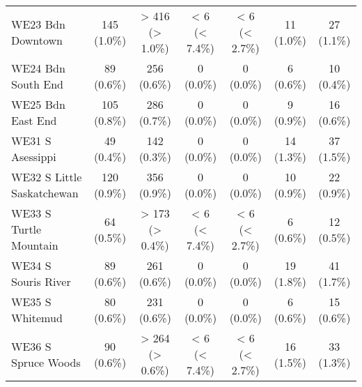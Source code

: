 \documentclass{article}
\begin{document}
\begin{table}[htbp]
\begin{tabular}{l*{6}{c}}
  WE23 Bdn Downtown                                     &           145 (1.0\%)           &         > 416 (> 1.0\%)         &          < 6 (< 7.4\%)          &          < 6 (< 2.7\%)          &            11 (1.0\%)           &            27 (1.1\%)           \\
  WE24 Bdn South End                                    &            89 (0.6\%)           &           256 (0.6\%)           &            0 (0.0\%)            &            0 (0.0\%)            &            6 (0.6\%)            &            10 (0.4\%)           \\
  WE25 Bdn East End                                     &           105 (0.8\%)           &           286 (0.7\%)           &            0 (0.0\%)            &            0 (0.0\%)            &            9 (0.9\%)            &            16 (0.6\%)           \\
  WE31 S Asessippi                                      &            49 (0.4\%)           &           142 (0.3\%)           &            0 (0.0\%)            &            0 (0.0\%)            &            14 (1.3\%)           &            37 (1.5\%)           \\
  WE32 S Little Saskatchewan                            &           120 (0.9\%)           &           356 (0.9\%)           &            0 (0.0\%)            &            0 (0.0\%)            &            10 (0.9\%)           &            22 (0.9\%)           \\
  WE33 S Turtle Mountain                                &            64 (0.5\%)           &         > 173 (> 0.4\%)         &          < 6 (< 7.4\%)          &          < 6 (< 2.7\%)          &            6 (0.6\%)            &            12 (0.5\%)           \\
  WE34 S Souris River                                   &            89 (0.6\%)           &           261 (0.6\%)           &            0 (0.0\%)            &            0 (0.0\%)            &            19 (1.8\%)           &            41 (1.7\%)           \\
  WE35 S Whitemud                                       &            80 (0.6\%)           &           231 (0.6\%)           &            0 (0.0\%)            &            0 (0.0\%)            &            6 (0.6\%)            &            15 (0.6\%)           \\
  WE36 S Spruce Woods                                   &            90 (0.6\%)           &         > 264 (> 0.6\%)         &          < 6 (< 7.4\%)          &          < 6 (< 2.7\%)          &            16 (1.5\%)           &            33 (1.3\%)           \\

\end{tabular}
\end{table}
\end{document}

